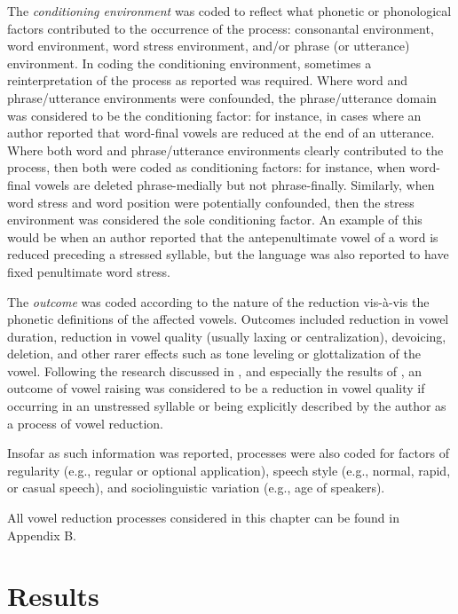   The \textit{conditioning environment} was coded to reflect what phonetic or phonological factors contributed to the occurrence of the process: consonantal environment, word environment, word stress environment, and/or phrase (or utterance) environment. In coding the conditioning environment, sometimes a reinterpretation of the process as reported was required. Where word and phrase/utterance environments were confounded, the phrase/utterance domain was considered to be the conditioning factor: for instance, in cases where an author reported that word-final vowels are reduced at the end of an utterance. Where both word and phrase/utterance environments clearly contributed to the process, then both were coded as conditioning factors: for instance, when word-final vowels are deleted phrase-medially but not phrase-finally. Similarly, when word stress and word position were potentially confounded, then the stress environment was considered the sole conditioning factor. An example of this would be when an author reported that the antepenultimate vowel of a word is reduced preceding a stressed syllable, but the language was also reported to have fixed penultimate word stress.

  The \textit{outcome} was coded according to the nature of the reduction vis-à-vis the phonetic definitions of the affected vowels. Outcomes included reduction in vowel duration, reduction in vowel quality (usually laxing or centralization), devoicing, deletion, and other rarer effects such as tone leveling or glottalization of the vowel. Following the research discussed in , and especially the results of \citet{KapatsinskiEtAl2019}, an outcome of vowel raising was considered to be a reduction in vowel quality if occurring in an unstressed syllable or being explicitly described by the author as a process of vowel reduction.

  Insofar as such information was reported, processes were also coded for factors of regularity (e.g., regular or optional application), speech style (e.g., normal, rapid, or casual speech), and sociolinguistic variation (e.g., age of speakers).

  All vowel reduction processes considered in this chapter can be found in Appendix B.

\section{ Results}\label{sec:6.3}

